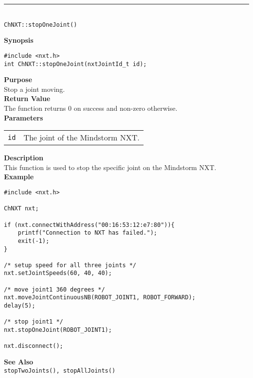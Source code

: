 \noindent
\vspace{5pt}
\rule{4.5in}{0.015in}\\
\noindent
{\LARGE \texttt{ChNXT::stopOneJoint()} }\\


\noindent
{\bf Synopsis}
\vspace{-8pt}
\begin{verbatim}
#include <nxt.h>
int ChNXT::stopOneJoint(nxtJointId_t id);
\end{verbatim}

\noindent
{\bf Purpose}\\
Stop a joint moving.\\

\noindent
{\bf Return Value}\\
The function returns 0 on success and non-zero otherwise.\\

\noindent
{\bf Parameters}\\
\vspace{-0.1in}
\begin{description}
\item
\begin{tabular}{ p{20mm}p{135mm} }
\texttt{id}       &The joint of the Mindstorm NXT.\\
\end{tabular}
\end{description}

\noindent
{\bf Description}\\
This function is used to stop the specific joint on the Mindstorm NXT.\\

\noindent
{\bf Example}
\begin{verbatim}
#include <nxt.h> 

ChNXT nxt;

if (nxt.connectWithAddress("00:16:53:12:e7:80")){
    printf("Connection to NXT has failed.");
    exit(-1);
}
    
/* setup speed for all three joints */
nxt.setJointSpeeds(60, 40, 40);

/* move joint1 360 degrees */
nxt.moveJointContinuousNB(ROBOT_JOINT1, ROBOT_FORWARD);
delay(5);

/* stop joint1 */
nxt.stopOneJoint(ROBOT_JOINT1);

nxt.disconnect();
\end{verbatim}

\noindent
{\bf See Also}\\
\texttt{stopTwoJoints(), stopAllJoints()}\\
